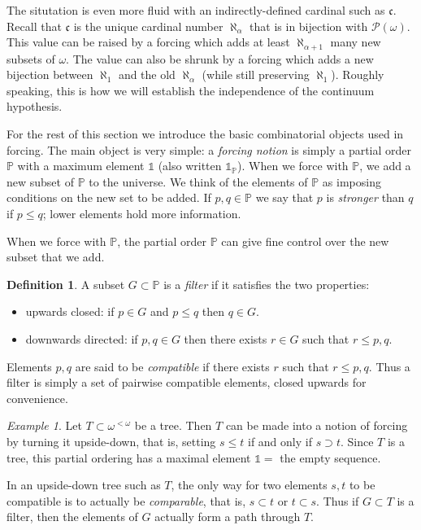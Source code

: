 \documentclass[11pt,oneside]{amsbook}
\newcommand{\PP}{\mathbb P}
\theoremstyle{definition}
\theoremstyle{plain}
\theoremstyle{definition}
\newtheorem{defn}[thm]{Definition}
\theoremstyle{remark}
\newtheorem{example}[thm]{Example}
\begin{document}
The situtation is even more fluid with an indirectly-defined cardinal such as $\mathfrak c$. Recall that $\mathfrak c$ is the unique cardinal number $\aleph_\alpha$ that is in bijection with $\mathcal P(\omega)$. This value can be raised by a forcing which adds at least $\aleph_{\alpha+1}$ many new subsets of $\omega$. The value can also be shrunk by a forcing which adds a new bijection between $\aleph_1$ and the old $\aleph_\alpha$ (while still preserving $\aleph_1$). Roughly speaking, this is how we will establish the independence of the continuum hypothesis.

For the rest of this section we introduce the basic combinatorial objects used in forcing. The main object is very simple: a \emph{forcing notion} is simply a partial order $\PP$ with a maximum element $\mathbb1$ (also written $\mathbb1_\PP$). When we force with $\PP$, we add a new subset of $\PP$ to the universe. We think of the elements of $\PP$ as imposing conditions on the new set to be added. If $p,q\in\PP$ we say that $p$ is \emph{stronger} than $q$ if $p\leq q$; lower elements hold more information.

When we force with $\PP$, the partial order $\PP$ can give fine control over the new subset that we add.

\begin{defn}
  A subset $G\subset\PP$ is a \emph{filter} if it satisfies the two properties:
  \begin{itemize}
  \item upwards closed: if $p\in G$ and $p\leq q$ then $q\in G$.
  \item downwards directed: if $p,q\in G$ then there exists $r\in G$ such that $r\leq p,q$.
  \end{itemize}
\end{defn}

Elements $p,q$ are said to be \emph{compatible} if there exists $r$ such that $r\leq p,q$. Thus a filter is simply a set of pairwise compatible elements, closed upwards for convenience.

\begin{example}
  Let $T\subset\omega^{<\omega}$ be a tree. Then $T$ can be made into a notion of forcing by turning it upside-down, that is, setting $s\leq t$ if and only if $s\supset t$. Since $T$ is a tree, this partial ordering has a maximal element $\mathbb1=$ the empty sequence.

  In an upside-down tree such as $T$, the only way for two elements $s,t$ to be compatible is to actually be \emph{comparable}, that is, $s\subset t$ or $t\subset s$. Thus if $G\subset T$ is a filter, then the elements of $G$ actually form a path through $T$.
\end{example}
\end{document}

